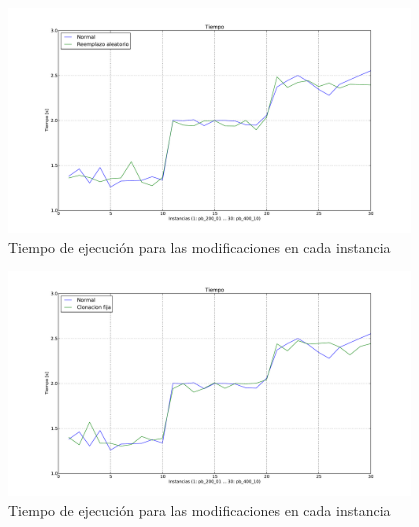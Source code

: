 \begin{figure}[h!]
\begin{center}
\includegraphics[width=0.95\textwidth]{img/t-3.pdf}
\end{center}
\caption{Tiempo de ejecución para las modificaciones en cada instancia}
\label{fig:t-3}
\end{figure}

\begin{figure}[h!]
\begin{center}
\includegraphics[width=0.95\textwidth]{img/t-4.pdf}
\end{center}
\caption{Tiempo de ejecución para las modificaciones en cada instancia}
\label{fig:t-4}
\end{figure}
